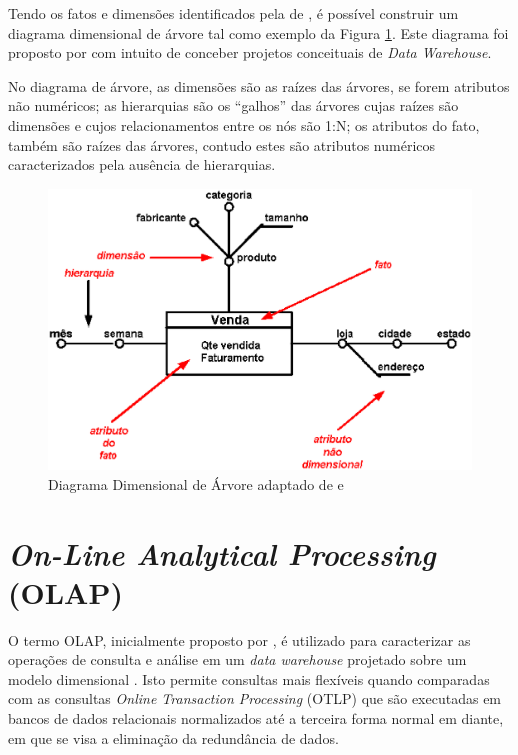 Tendo os fatos e dimensões identificados pela de , é possível construir um diagrama dimensional de árvore tal como exemplo da Figura \ref{fig:tree}. Este diagrama foi proposto por  com intuito de conceber projetos conceituais de \textit{Data Warehouse}.  

No diagrama de árvore, as dimensões são as raízes das árvores, se forem atributos não numéricos; as hierarquias são os “galhos” das árvores cujas raízes são dimensões e cujos relacionamentos entre os nós são 1:N; os atributos do fato, também são raízes das árvores, contudo estes são atributos numéricos caracterizados pela ausência de hierarquias.


\begin{figure}[ht!]
\centering
\includegraphics[keepaspectratio=true,scale=0.5]{figuras/arvore.eps}
\caption{Diagrama Dimensional de Árvore adaptado de  e }
\label{fig:tree}
\end{figure}
\FloatBarrier


\section{\textit{On-Line Analytical Processing} (OLAP)}

O termo OLAP, inicialmente proposto por , é utilizado para caracterizar as operações de consulta e análise em um \textit{data warehouse} projetado sobre um modelo dimensional \cite{Kimball2002}. Isto permite consultas mais flexíveis quando comparadas com as consultas \textit{Online Transaction Processing} (OTLP) que são executadas em bancos de dados relacionais normalizados até a terceira forma normal em diante, em que se visa a eliminação da redundância de dados.

